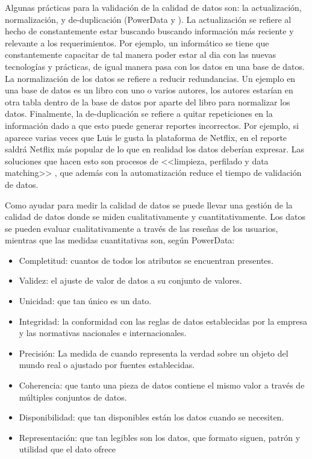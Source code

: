 \documentclass[12pt, article, natbib]{IEEEtran}
\begin{document}
Algunas prácticas para la validación de la calidad de datos son: la actualización, normalización, y de-duplicación (PowerData \cite{powerdatacalidad} y \cite{deydedatacentric}). La actualización se refiere al hecho de constantemente estar buscando buscando información más reciente y relevante a los requerimientos. Por ejemplo, un informático se tiene que constantemente capacitar de tal manera poder estar al dia con las nuevas tecnologías y prácticas, de igual manera pasa con los datos en una base de datos. La normalización de los datos se refiere a reducir redundancias. Un ejemplo en una base de datos es un libro con uno o varios autores, los autores estarían en otra tabla dentro de la base de datos por aparte del libro para normalizar los datos. Finalmente, la de-duplicación se refiere a quitar repeticiones en la información dado a que esto puede generar reportes incorrectos. Por ejemplo, si aparece varias veces que Luis le gusta la plataforma de Netflix, en el reporte saldrá Netflix más popular de lo que en realidad los datos deberían expresar. Las soluciones que hacen esto son procesos de <<limpieza, perfilado y data matching>> \cite{powerdatacalidad}, que además con la automatización reduce el tiempo de validación de datos.

Como ayudar para medir la calidad de datos se puede llevar una gestión de la calidad de datos donde se miden cualitativamente y cuantitativamente. Los datos se pueden evaluar cualitativamente a través de las reseñas de los usuarios, mientras que las medidas cuantitativas son, según PowerData:
\begin {itemize}
	\item Completitud: cuantos de todos los atributos se encuentran presentes.
	\item Validez: el ajuste de valor de datos a su conjunto de valores.
	\item Unicidad: que tan único es un dato.
	\item Integridad: la conformidad con las reglas de datos establecidas por la empresa y las normativas nacionales e internacionales.
	\item Precisión: La medida de cuando representa la verdad sobre un objeto del mundo real o ajustado por fuentes establecidas.
	\item Coherencia: que tanto una pieza de datos contiene el mismo valor a través de múltiples conjuntos de datos.
	\item Disponibilidad: que tan disponibles están los datos cuando se necesiten.
	\item Representación: que tan legibles son los datos, que formato siguen, patrón y utilidad que el dato ofrece
\end{itemize}
\end{document}
